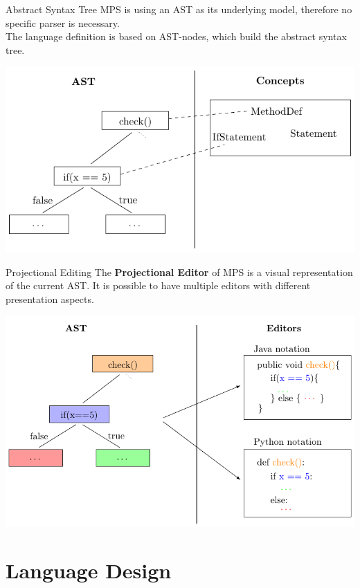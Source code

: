 	\begin{frame}{Abstract Syntax Tree}
		MPS is using an AST as its underlying model, therefore no specific parser is necessary.\\
		
		The language definition is based on AST-nodes, which build the abstract syntax tree.
		\begin{center}
			\includegraphics[height=0.7\textheight]{tikz/ast.pdf}
		\end{center}
	\end{frame}

	\begin{frame}{Projectional Editing}
		The \textbf{Projectional Editor} of MPS is a visual representation of the current AST. It is possible to have multiple editors with different presentation aspects.
		\begin{center}
			\includegraphics[height=0.7\textheight]{tikz/editors.pdf}
		\end{center}
	\end{frame}

	\section{Language Design}
	
